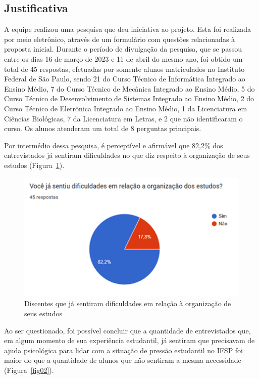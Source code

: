 \documentclass[12pt,a4paper]{article}
\begin{document}
\subsection{Justificativa}

A equipe realizou uma pesquisa que deu iniciativa ao projeto. Esta foi realizada por meio eletrônico, através de um formulário com questões relacionadas à proposta inicial. Durante o período de divulgação da pesquisa, que se passou entre os dias 16 de março de 2023 e 11 de abril do mesmo ano, foi obtido um total de 45 respostas, efetuadas por somente alunos matriculados no Instituto Federal de São Paulo, sendo 21 do Curso Técnico de Informática Integrado ao Ensino Médio, 7 do Curso Técnico de Mecânica Integrado ao Ensino Médio, 5 do Curso Técnico de Desenvolvimento de Sistemas Integrado ao Ensino Médio, 2 do Curso Técnico de Eletrônica Integrado ao Ensino Médio, 1 da Licenciatura em Ciências Biológicas, 7 da Licenciatura em Letras, e 2 que não identificaram o curso. Os alunos atenderam um total de 8 perguntas principais. 

Por intermédio dessa pesquisa, é perceptível e afirmável que 82,2\% dos entrevistados já sentiram dificuldades no que diz respeito à organização de seus estudos (Figura~\ref{fig01}).

\begin{figure}[H]
    \centering
    \includegraphics[width=12cm]{img1.png}
    \caption{Discentes que já sentiram dificuldades em relação à organização de seus estudos}
    \label{fig01}
\end{figure}

Ao ser questionado, foi possível concluir que a quantidade de entrevistados que, em algum momento de sua experiência estudantil, já sentiram que precisavam de ajuda psicológica para lidar com a situação de pressão estudantil no IFSP foi maior do que a quantidade de alunos que não sentiram a mesma necessidade (Figura~\ref{fig02}). 
\end{document}
